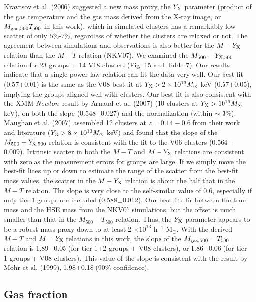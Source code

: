 \documentclass{aastex}
\def\xmm        {XMM-{\em Newton}\/}
\begin{document}
Kravtsov et al. (2006) suggested a new mass proxy, the $Y_{\rm X}$
parameter (product of the gas temperature and the gas mass derived from the
X-ray image, or $M_{\rm gas, 500} T_{500}$ in this work), which in simulated
clusters has a remarkably low scatter of only 5\%-7\%, regardless of whether
the clusters are relaxed or not. The agreement between simulations and observations
is also better for the $M - Y_{\rm X}$ relation than the $M - T$ relation (NKV07).
We examined the $M_{500} - Y_{\rm X, 500}$ relation for 23 groups + 14 V08 clusters
(Fig. 15 and Table 7). Our results indicate that a single power law
relation can fit the data very well. Our best-fit (0.57$\pm$0.01) is the same as
the V08 best-fit at $Y_{\rm X} > 2\times10^{13} M_{\odot}$ keV (0.57$\pm$0.05),
implying the groups aligned well with clusters.
Our best-fit is also consistent with the \xmm\ result by Arnaud et al. (2007)
(10 clusters at $Y_{\rm X} > 10^{13} M_{\odot}$ keV), on both the slope
(0.548$\pm$0.027) and the normalization (within $\sim$ 3\%).
Maughan et al. (2007) assembled 12 clusters at $z=0.14-0.6$ from their work and
literature ($Y_{\rm X} > 8\times10^{13} M_{\odot}$ keV) and found that the slope of the
$M_{500} - Y_{\rm X, 500}$
relation is consistent with the fit to the V06 clusters (0.564$\pm$0.009).
Intrinsic scatter in both the $M-T$ and $M - Y_{\rm X}$
relations are consistent with zero as the measurement errors for groups are large.
If we simply move the best-fit lines up or down to estimate the range of the scatter
from the best-fit mass values, the scatter in the $M - Y_{\rm X}$ relation is about the
half that in the $M - T$ relation. The slope is very close to the self-similar value of
0.6, especially if only tier 1 groups are included (0.588$\pm$0.012).
Our best fits lie between the true mass and the HSE mass from the NKV07 simulations,
but the offset is much smaller than that in the $M_{500} - T_{500}$ relation.
Thus, the $Y_{\rm X}$ parameter appears to be a robust mass proxy down to at least
2 $\times 10^{13}$ h$^{-1}$ M$_{\odot}$.
With the derived $M-T$ and $M - Y_{\rm X}$ relations in this work, the slope of
the $M_{\rm gas, 500}-T_{500}$ relation is 1.89$\pm$0.05 (for tier 1+2 groups +
V08 clusters), or 1.86$\pm$0.06 (for tier 1 groups + V08 clusters).
This value of the slope is consistent with the result by Mohr et al. (1999),
1.98$\pm$0.18 (90\% confidence).

\subsection{Gas fraction}
\end{document}
